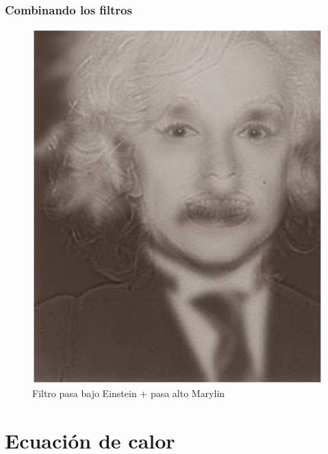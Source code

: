 \begin{frame}
\frametitle{Combinando los filtros}
\begin{figure}
    \includegraphics[scale=0.25]{Imagenes/Einstein_Marylin_BA_01.eps}
    \caption{Filtro pasa bajo Einstein + pasa alto Marylin}
\end{figure}
\end{frame}
\section{Ecuación de calor}
